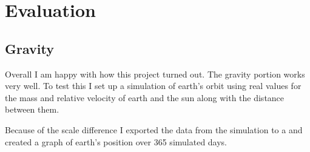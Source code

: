 \section{Evaluation}

	\subsection{Gravity}
	Overall I am happy with how this project turned out. The gravity portion works very well. To test this I set up a simulation of earth's orbit using real values for the mass and relative velocity of earth and the sun along with the distance between them.
	
	Because of the scale difference I exported the data from the simulation to a  and created a graph of earth's position over 365 simulated days.
	
